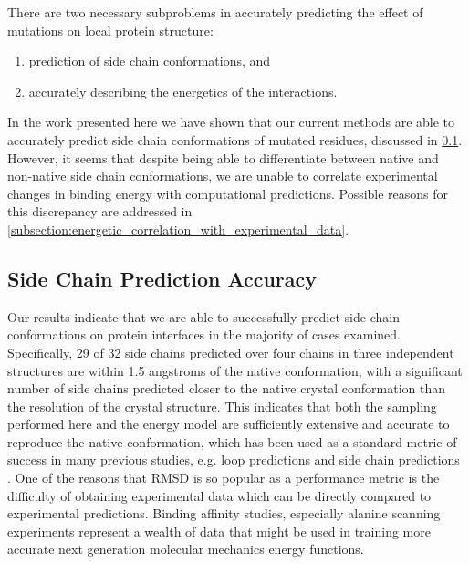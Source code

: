 There are two necessary subproblems in accurately predicting the effect of mutations on local protein structure:
\begin{enumerate}
\item prediction of side chain conformations, and
\item accurately describing the energetics of the interactions.
\end{enumerate}
In the work presented here we have shown that our current methods are able to accurately predict side chain conformations of mutated residues, discussed in \ref{subsection:side_chain_prediction_accuracy}.
However, it seems that despite being able to differentiate between native and non-native side chain conformations, we are unable to correlate experimental changes in binding energy with computational predictions.
Possible reasons for this discrepancy are addressed in \ref{subsection:energetic_correlation_with_experimental_data}.

\subsection{Side Chain Prediction Accuracy}
\label{subsection:side_chain_prediction_accuracy}
Our results indicate that we are able to successfully predict side chain conformations on protein interfaces in the majority of cases examined.
Specifically, 29 of 32 side chains predicted over four chains in three independent structures are within 1.5 angstroms of the native conformation, with a significant number of side chains predicted closer to the native crystal conformation than the resolution of the crystal structure.
This indicates that both the sampling performed here and the energy model are sufficiently extensive and accurate to reproduce the native conformation, which has been used as a standard metric of success in many previous studies, e.g. loop predictions \cite{jacobson2004hierarchical,rapp1999prediction,zhu2006long,sellers2008toward} and side chain predictions \cite{jacobson2002force,jacobson2002role,zhu2007improved}.
One of the reasons that RMSD is so popular as a performance metric is the difficulty of obtaining experimental data which can be directly compared to experimental predictions.
Binding affinity studies, especially alanine scanning experiments represent a wealth of data that might be used in training more accurate next generation molecular mechanics energy functions.


